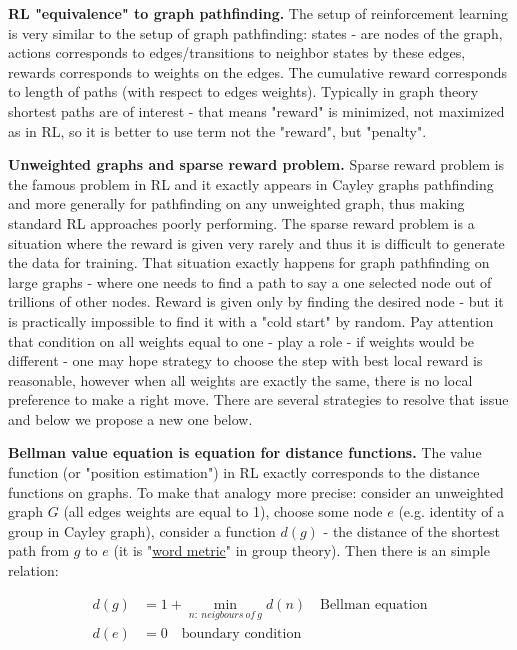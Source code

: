 \documentclass[atmp]{ipart_v1}
\numberwithin{equation}{section}
\theoremstyle{plain}%
\begin{document}
{\bf RL "equivalence" to graph pathfinding. }
The setup of reinforcement learning is very similar to the setup of graph pathfinding: states - are nodes of the graph, actions corresponds to edges/transitions to neighbor states by these edges, rewards corresponds to weights on the edges. The cumulative reward corresponds to  length of paths (with respect to edges weights). Typically in graph theory shortest paths are of interest - that means "reward" is minimized, not maximized as in RL, so it is better to use term not the "reward", but "penalty". 

{\bf Unweighted graphs and sparse reward problem.}
Sparse reward problem is the famous problem in RL and it exactly appears in Cayley graphs pathfinding and more generally for pathfinding on any unweighted graph, thus making standard RL approaches poorly performing.
The sparse reward problem is a situation where the reward is given very rarely and thus  it is difficult to generate the data for training. That situation exactly happens for graph pathfinding on large graphs - where one needs to find a path to say a one selected node out of trillions of other nodes. Reward is given only by finding the desired node - but it is practically impossible to find it with a "cold start" by random. Pay attention that condition on all weights equal to one - play a role - if weights would be different - one may hope strategy to choose the  step with best local reward is reasonable, however when all weights are exactly the same, there is no local preference to make a right move. 
There are several strategies to resolve that issue and below we propose a new one below. 

{\bf Bellman value equation  is equation for distance functions.}
The value function (or "position estimation") in RL exactly corresponds to the distance functions on graphs. 
To make that analogy more precise: consider an unweighted  graph $G$ (all edges weights are equal to 1), choose some node $e$ (e.g. identity of a group in Cayley graph), consider a function $d(g)$ - the distance of the shortest path from $g$ to $e$ (it is "\href{https://en.wikipedia.org/wiki/Word_metric}{word metric}" in group theory). Then there is an simple relation:

\begin{align} 
\label{bel_eq}
d(g) & = 1 + \min_{n:~neigbours~of~g} d(n)  \text{~~~Bellman equation}\\
d(e) & = 0 \text{~~~boundary condition}
\end{align} 
\end{document}
